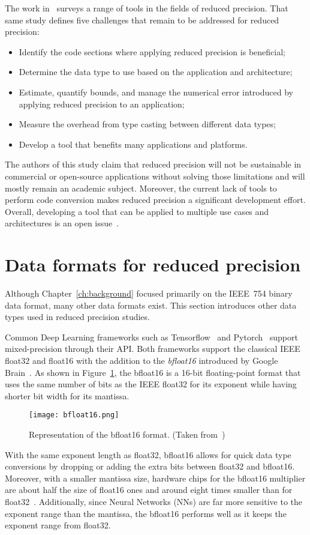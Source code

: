 The work in~\cite{Cherubin2020-tt} surveys a range of tools in the fields of reduced precision.
That same study defines five challenges that remain to be addressed for reduced precision:
\begin{itemize}
	\item[1.] Identify the code sections where applying reduced precision is beneficial;
	\item[2.] Determine the data type to use based on the application and architecture;
	\item[3.] Estimate, quantify bounds, and manage the numerical error introduced by applying reduced precision to an application;
	\item[4.] Measure the overhead from type casting between different data types;
	\item[5.] Develop a tool that benefits many applications and platforms.
\end{itemize}
The authors of this study claim that reduced precision will not be sustainable
in commercial or open-source applications without solving those limitations and
will mostly remain an academic subject.
Moreover, the current lack of tools to perform code conversion makes reduced precision
a significant development effort.
Overall, developing a tool that can be applied to multiple use cases and
architectures is an open issue~\cite{Cherubin2020-tt}.

\section{Data formats for reduced precision}
\label{sc:rp-data-format}
Although Chapter~\ref{ch:background} focused primarily on the IEEE~754 binary data format, many other data formats exist.
This section introduces other data types used in reduced precision studies.

Common Deep Learning frameworks such as Tensorflow~\cite{tensorflow2015-whitepaper} and Pytorch~\cite{Paszke2019-sm} support mixed-precision through their API.
Both frameworks support the classical IEEE float32 and float16 with the addition to the \textit{bfloat16} introduced by Google Brain~\cite{bfloat16}.
As shown in Figure~\ref{fig:bfloat16}, the bfloat16 is a 16-bit floating-point format that uses
the same number of bits as the IEEE float32 for its exponent while having shorter bit width for its mantissa.
\begin{figure}[b]
	\centering
	\texttt{[image: bfloat16.png]}
	\caption{Representation of the bfloat16 format. (Taken from~\cite{bfloat16-png})}
	\label{fig:bfloat16}
\end{figure}
With the same exponent length as float32, bfloat16 allows for quick data type
conversions by dropping or adding the extra bits between float32 and bfloat16.
Moreover, with a smaller mantissa size, hardware chips for the bfloat16 multiplier
are about half the size of float16 ones and around eight times smaller than for float32~\cite{bfloat16}.
Additionally, since Neural Networks (NNs) are far more sensitive to the exponent range than the mantissa,
the bfloat16 performs well as it keeps the exponent range from float32.

